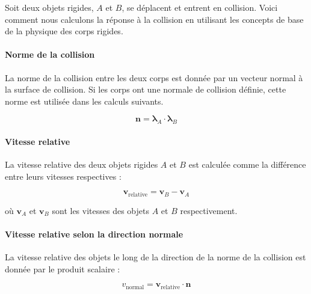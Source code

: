     \newpage

    Soit deux objets rigides, \( A \) et \( B \), se déplacent et entrent
    en collision. Voici comment nous calculons la réponse à la collision
    en utilisant les concepts de base de la physique des corps rigides.

    \begin{multicols}{2}  %
        
        \paragraph{Norme de la collision}
        La norme de la collision entre les deux corps est donnée par un vecteur
        normal à la surface de collision. Si les corps ont une normale de
        collision définie, cette norme est utilisée dans les calculs suivants.
        
        \begin{equation}
        \mathbf{n} = \mathbf{\lambda}_A \cdot \mathbf{\lambda}_B
        \end{equation}
        
        \paragraph{Vitesse relative}
        La vitesse relative des deux objets rigides \( A \) et \( B \) est calculée
        comme la différence entre leurs vitesses respectives :
        
        \begin{equation}
        \mathbf{v}_{\text{relative}} = \mathbf{v}_B - \mathbf{v}_A
        \end{equation}

        où \( \mathbf{v}_A \) et \( \mathbf{v}_B \) sont les vitesses des objets
        \( A \) et \( B \) respectivement.
        
        \paragraph{Vitesse relative selon la direction normale}
        La vitesse relative des objets le long de la direction de la norme de la
        collision est donnée par le produit scalaire :
        
        \begin{equation}
        v_{\text{normal}} = \mathbf{v}_{\text{relative}} \cdot \mathbf{n}
        \end{equation}
        

\end{multicols}
